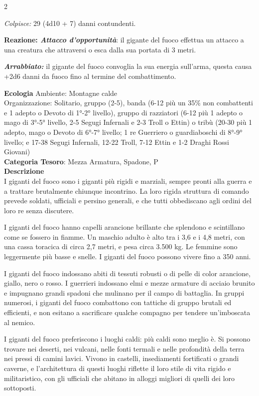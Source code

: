 \begin{multicols}{2}
{\emph{Colpisce:} 29 (4d10 + 7) danni contundenti.

\textbf{Reazione: \emph{Attacco d'opportunità}}: il gigante del fuoco effettua un attacco a una creatura che attraversi o esca dalla sua portata di 3 metri.

\emph{\textbf{Arrabbiato:}} il gigante del fuoco convoglia la sua energia sull'arma, questa causa +2d6 danni da fuoco fino al termine del combattimento.

\textbf{Ecologia}
Ambiente: Montagne calde\\
Organizzazione: Solitario, gruppo (2-5), banda (6-12 più un 35\% non combattenti e 1 adepto o Devoto di 1°-2° livello), gruppo di razziatori (6-12 più 1 adepto o mago di 3°-5° livello, 2-5 Segugi Infernali e 2-3 Troll o Ettin) o tribù (20-30 più 1 adepto, mago o Devoto di 6°-7° livello; 1 re Guerriero o guardiaboschi di 8°-9° livello; e 17-38 Segugi Infernali, 12-22 Troll, 7-12 Ettin e 1-2 Draghi Rossi Giovani)\\
\textbf{Categoria Tesoro}: Mezza Armatura, Spadone, P\\
\textbf{Descrizione}\\
I giganti del fuoco sono i giganti più rigidi e marziali, sempre pronti alla guerra e a trattare brutalmente chiunque incontrino. La loro rigida struttura di comando prevede soldati, ufficiali e persino generali, e che tutti obbediscano agli ordini del loro re senza discutere.

I giganti del fuoco hanno capelli arancione brillante che splendono e scintillano come se fossero in fiamme. Un maschio adulto è alto tra i 3,6 e i 4,8 metri, con una cassa toracica di circa 2,7 metri, e pesa circa 3.500 kg. Le femmine sono leggermente più basse e snelle. I giganti del fuoco possono vivere fino a 350 anni.

I giganti del fuoco indossano abiti di tessuti robusti o di pelle di color arancione, giallo, nero o rosso. I guerrieri indossano elmi e mezze armature di acciaio brunito e impugnano grandi spadoni che mulinano per il campo di battaglia. In gruppi numerosi, i giganti del fuoco combattono con tattiche di gruppo brutali ed efficienti, e non esitano a sacrificare qualche compagno per tendere un'imboscata al nemico.

I giganti del fuoco preferiscono i luoghi caldi: più caldi sono meglio è. Si possono trovare nei deserti, nei vulcani, nelle fonti termali e nelle profondità della terra nei pressi di camini lavici. Vivono in castelli, insediamenti fortificati o grandi caverne, e l'architettura di questi luoghi riflette il loro stile di vita rigido e militaristico, con gli ufficiali che abitano in alloggi migliori di quelli dei loro sottoposti.

}
\end{multicols}
